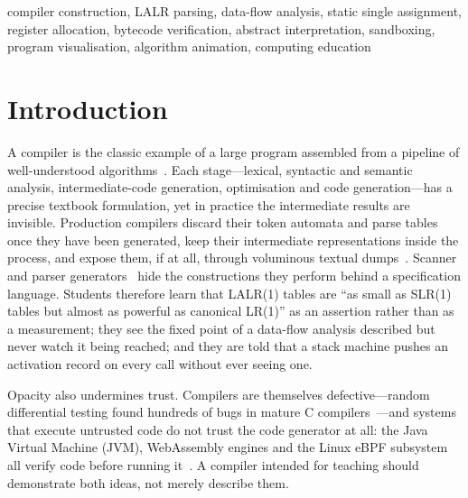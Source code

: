 \documentclass[conference]{IEEEtran}
\begin{document}
\begin{IEEEkeywords}
compiler construction, LALR parsing, data-flow analysis, static single assignment, register allocation, bytecode verification, abstract interpretation, sandboxing, program visualisation, algorithm animation, computing education
\end{IEEEkeywords}

\section{Introduction}
\label{sec:intro}

A compiler is the classic example of a large program assembled from a pipeline of well-understood algorithms~\cite{aho2006,appel2002,cooper2011}. Each stage---lexical, syntactic and semantic analysis, intermediate-code generation, optimisation and code generation---has a precise textbook formulation, yet in practice the intermediate results are invisible. Production compilers discard their token automata and parse tables once they have been generated, keep their intermediate representations inside the process, and expose them, if at all, through voluminous textual dumps~\cite{gccdev}. Scanner and parser generators~\cite{lesk1975,johnson1975,parr1995} hide the constructions they perform behind a specification language. Students therefore learn that LALR(1) tables are ``as small as SLR(1) tables but almost as powerful as canonical LR(1)'' as an assertion rather than as a measurement; they see the fixed point of a data-flow analysis described but never watch it being reached; and they are told that a stack machine pushes an activation record on every call without ever seeing one.

Opacity also undermines trust. Compilers are themselves defective---random differential testing found hundreds of bugs in mature C compilers~\cite{yang2011}---and systems that execute untrusted code do not trust the code generator at all: the Java Virtual Machine (JVM), WebAssembly engines and the Linux eBPF subsystem all verify code before running it~\cite{lindholm2014,leroy2003,haas2017,gershuni2019}. A compiler intended for teaching should demonstrate both ideas, not merely describe them.
\end{document}
